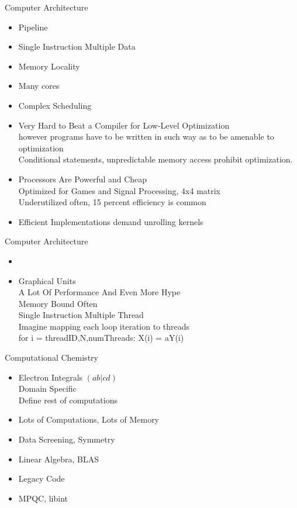 \documentclass{beamer}
\begin{document}
\begin{frame}{ Computer Architecture}
\begin{itemize}
\item Pipeline
\item Single Instruction Multiple Data
\item Memory Locality
\item Many cores
\item Complex Scheduling
\item Very Hard to Beat a Compiler for Low-Level Optimization\\
however programs have to be written in such way as to be amenable to optimization\\
Conditional statements, unpredictable memory access prohibit optimization.
\item Processors Are Powerful and Cheap\\
     Optimized for Games and Signal Processing, 4x4 matrix\\
     Underutilized often, 15 percent efficiency is common
\item  Efficient Implementations demand unrolling kernels
\end{itemize}
\end{frame}

\begin{frame}{ Computer Architecture}
\begin{itemize}
\item 
\item   Graphical Units\\
 A Lot Of Performance And Even More Hype\\
 Memory Bound Often\\
 Single Instruction Multiple Thread\\
 Imagine mapping each loop iteration to threads\\
 for i  = threadID,N,numThreads:  X(i) = aY(i)
\end{itemize}
\end{frame}

\begin{frame}{  Computational Chemistry}
\begin{itemize}
\item Electron Integrals $(ab|cd)$\\
  Domain Specific\\
  Define rest of computations
\item Lots of Computations, Lots of Memory
\item Data Screening, Symmetry
\item  Linear Algebra, BLAS
\item Legacy Code
\item MPQC, libint
\end{itemize}
\end{frame}
\end{document}
